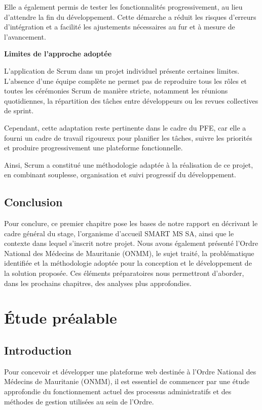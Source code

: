 ﻿\documentclass[12pt,a4paper]{report}
\begin{document}
Elle a également permis de tester les fonctionnalités progressivement, au lieu
d'attendre la fin du développement. Cette démarche a réduit les risques
d'erreurs d'intégration et a facilité les ajustements nécessaires au fur et à
mesure de l'avancement.

\textbf{Limites de l'approche adoptée}

L'application de Scrum dans un projet individuel présente certaines limites.
L'absence d'une équipe complète ne permet pas de reproduire tous les rôles et
toutes les cérémonies Scrum de manière stricte, notamment les réunions
quotidiennes, la répartition des tâches entre développeurs ou les revues
collectives de sprint.

Cependant, cette adaptation reste pertinente dans le cadre du PFE, car elle a
fourni un cadre de travail rigoureux pour planifier les tâches, suivre les
priorités et produire progressivement une plateforme fonctionnelle.

Ainsi, Scrum a constitué une méthodologie adaptée à la réalisation de ce
projet, en combinant souplesse, organisation et suivi progressif du
développement.

\section{Conclusion}
Pour conclure, ce premier chapitre pose les bases de notre rapport en décrivant le cadre général du stage, l’organisme d’accueil SMART MS SA, ainsi que le contexte dans lequel s’inscrit notre projet. Nous avons également présenté l’Ordre National des Médecins de Mauritanie (ONMM), le sujet traité, la problématique identifiée et la méthodologie adoptée pour la conception et le développement de la solution proposée. Ces éléments préparatoires nous permettront d’aborder, dans les prochains chapitres, des analyses plus approfondies.

\chapter{\'Etude pr\'ealable}

\section{Introduction}

Pour concevoir et développer une plateforme web destinée à l'Ordre
National des Médecins de Mauritanie (ONMM), il est essentiel de
commencer par une étude approfondie du fonctionnement actuel des
processus administratifs et des méthodes de gestion utilisées au sein
de l'Ordre.
\end{document}
